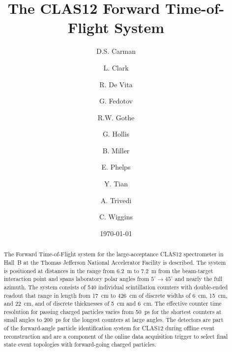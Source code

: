 \documentclass[3p,times,twocolumn]{elsarticle}
\begin{document}
\begin{frontmatter}

\title{The CLAS12 Forward Time-of-Flight System}

\author[JLab]{D.S. Carman}
\author[Glasgow]{L. Clark}
\author[INFN]{R. De Vita}
\author[USC,Russia]{G. Fedotov}
\author[USC]{R.W. Gothe}
\author[USC]{G. Hollis}
\author[JLab]{B. Miller}
\author[USC]{E. Phelps}
\author[USC]{Y. Tian}
\author[USC]{A. Trivedi}
\author[JLab]{C. Wiggins}

\address[JLab]{Thomas Jefferson National Accelerator Facility, Newport News, VA 23606, USA}
\address[Glasgow]{University of Glasgow, Glasgow G12 8QQ, United Kingdom}
\address[INFN]{INFN, Sezione di Genova, 16146 Genova, Italy}
\address[USC]{University of South Carolina, Columbia, SC 29208, USA}
\address[Russia]{National Research Centre ``Kurchatov Institute'', Gatchina 188300, Russia}

\date{\today}


\begin{abstract}
The Forward Time-of-Flight system for the large-acceptance CLAS12 spectrometer in Hall~B at the
Thomas Jefferson National Accelerator Facility is described. The system is positioned at distances
in the range from 6.2~m to 7.2~m from the beam-target interaction point and spans laboratory polar
angles from $5^\circ \to 45^\circ$ and nearly the full azimuth. The system consists of 540 individual
scintillation counters with double-ended readout that range in length from 17~cm to 426~cm of
discrete widths of 6~cm, 15~cm, and 22~cm, and of discrete thicknesses of 5~cm and 6~cm. The
effective counter time resolution for passing charged particles varies from 50~ps for the shortest
counters at small angles to 200~ps for the longest counters at large angles. The detectors are part
of the forward-angle particle identification system for CLAS12 during offline event reconstruction
and are a component of the online data acquisition trigger to select final state event topologies with
forward-going charged particles.
\end{abstract}

\end{frontmatter}
\end{document}
